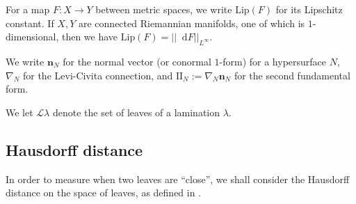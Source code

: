 \documentclass[reqno,11pt]{amsart}
\newcommand{\RR}{\mathbf{R}}
\newcommand{\Sph}{\mathbf S}
\newcommand*\dif{\mathop{}\!\mathrm{d}}
\DeclareMathOperator{\supp}{supp}
\newcommand{\Leaves}{\mathscr L}
\newcommand{\Two}{\mathrm{I\!I}}
\newcommand{\normal}{\mathbf n}
\newcommand{\Lip}{\mathrm{Lip}}
\newcommand{\dfn}[1]{\emph{#1}\index{#1}}
\theoremstyle{definition}
\newtheorem{definition}[theorem]{Definition}
\newtheorem{example}[theorem]{Example}
\numberwithin{equation}{section}
\begin{document}
For a map $F: X \to Y$ between metric spaces, we write $\Lip(F)$ for its Lipschitz constant.
If $X, Y$ are connected Riemannian manifolds, one of which is $1$-dimensional, then we have $\Lip(F) = ||\dif F||_{L^\infty}$.

We write $\normal_N$ for the normal vector (or conormal $1$-form) for a hypersurface $N$, $\nabla_N$ for the Levi-Civita connection, and $\Two_N := \nabla_N \normal_N$ for the second fundamental form.

We let $\Leaves \lambda$ denote the set of leaves of a lamination $\lambda$.





\subsection{Hausdorff distance}
In order to measure when two leaves are ``close'', we shall consider the Hausdorff distance on the space of leaves, as defined in \cite[Chapter 4]{nadler2017continuum}.
\end{document}
